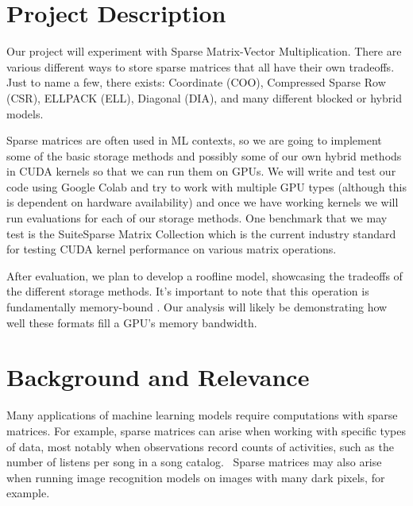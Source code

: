 \documentclass[11pt]{article}
\begin{document}


\section{Project Description}

Our project will experiment with Sparse Matrix-Vector Multiplication. There are various different ways to store sparse matrices that all have their own tradeoffs. Just to name a few, there exists: Coordinate (COO), Compressed Sparse Row (CSR), ELLPACK (ELL), Diagonal (DIA), and many different blocked or hybrid models\cite{formats}.

Sparse matrices are often used in ML contexts, so we are going to implement some of the basic storage methods and possibly some of our own hybrid methods in CUDA kernels so that we can run them on GPUs. We will write and test our code using Google Colab and try to work with multiple GPU types (although this is dependent on hardware availability) and once we have working kernels we will run evaluations for each of our storage methods. One benchmark that we may test is the SuiteSparse Matrix Collection \cite{SuiteSparse} which is the current industry standard for testing CUDA kernel performance on various matrix operations.

After evaluation, we plan to develop a roofline model, showcasing the tradeoffs of the different storage methods. It's important to note that this operation is fundamentally memory-bound \cite{Davis2012SpMVAM}. Our analysis will likely be demonstrating how well these formats fill a GPU's memory bandwidth.

\section{Background and Relevance}

Many applications of machine learning models require computations with sparse matrices. For example, sparse matrices can arise when working with specific types of data, most notably when observations record counts of activities, such as the number of listens per song in a song catalog.~\cite{machinelearningmastery}
Sparse matrices may also arise when running image recognition models on images with many dark pixels, for example.
\end{document}

